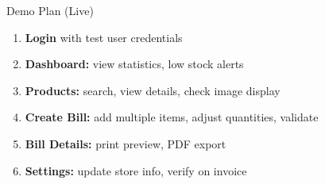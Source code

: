 \documentclass[aspectratio=169,11pt]{beamer}
\begin{document}
\begin{frame}{Demo Plan (Live)}

\begin{enumerate}
  \item \textbf{Login} with test user credentials
  
  \vspace{0.2cm}
  
  \item \textbf{Dashboard:} view statistics, low stock alerts
  
  \vspace{0.2cm}
  
  \item \textbf{Products:} search, view details, check image display
  
  \vspace{0.2cm}
  
  \item \textbf{Create Bill:} add multiple items, adjust quantities, validate
  
  \vspace{0.2cm}
  
  \item \textbf{Bill Details:} print preview, PDF export
  
  \vspace{0.2cm}
  
  \item \textbf{Settings:} update store info, verify on invoice
\end{enumerate}

\end{frame}
\end{document}
